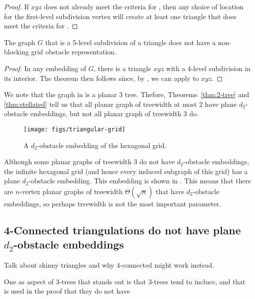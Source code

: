 \documentclass{patmorin}
\begin{document}
\begin{proof}
   If $xyz$ does not already meet the criteria for , then
   any choice of location for the first-level subdivision vertex will create
   at least one triangle that does meet the criteria for .
\end{proof}

\begin{thm}
   The graph $G$ that is a 5-level subdivision of a triangle does not
   have a non-blocking grid obstacle representation.
\end{thm}

\begin{proof}
   In any embedding of $G$, there is a triangle $xyz$ with a 4-level
   subdivision in its interior.  The theorem then follows since, by
   , we can apply  to $xyz$.
\end{proof}

We note that the graph in  is a planar 3 tree.
Thefore, Theorems~\ref{thm:2-tree} and \ref{thm:stellated} tell us that
all planar graph of treewidth at most 2 have plane $d_2$-obstacle embeddings,
but not all planar graph of treewidth 3 do.

\begin{figure}
   \begin{center}
      \texttt{[image: figs/triangular-grid]}
   \end{center}
   \caption{A $d_2$-obstacle embedding of the hexagonal grid.}
\end{figure}


Although some planar graphs of treewidth 3 do not have $d_2$-obstacle
embeddings, the infinite hexagonal grid (and hence every induced subgraph
of this grid) has a plane $d_2$-obstacle embedding.  This embedding
is shown in .  This means that there are $n$-vertex
planar graphs of treewidth $\Theta(\sqrt{n})$ that have $d_2$-obstacle
embeddings, so perhaps treewidth is not the most important parameter.

\subsection{4-Connected triangulations do not have plane $d_2$-obstacle embeddings}

Talk about skinny triangles and why 4-connected might work instead.


One as aspect of 3-trees that stands out is that 3-trees tend to incluce, and that is used in the proof that they do not have 
\end{document}
